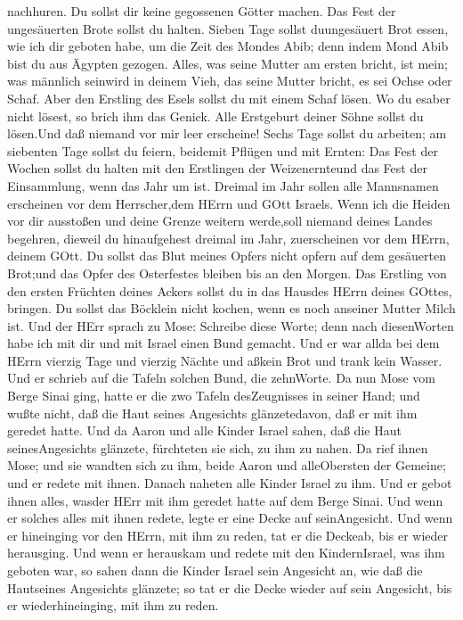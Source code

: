 nachhuren.  Du sollst dir keine gegossenen Götter machen.
 Das Fest der ungesäuerten Brote sollst du halten. Sieben
Tage sollst duungesäuert Brot essen, wie ich dir geboten habe, um die
Zeit des Mondes Abib; denn indem Mond Abib bist du aus Ägypten gezogen.
 Alles, was seine Mutter am ersten bricht, ist mein; was
männlich seinwird in deinem Vieh, das seine Mutter bricht, es sei Ochse
oder Schaf.  Aber den Erstling des Esels sollst du mit
einem Schaf lösen. Wo du esaber nicht lösest, so brich ihm das Genick.
Alle Erstgeburt deiner Söhne sollst du lösen.Und daß niemand vor mir
leer erscheine!  Sechs Tage sollst du arbeiten; am
siebenten Tage sollst du feiern, beidemit Pflügen und mit Ernten:
 Das Fest der Wochen sollst du halten mit den Erstlingen
der Weizenernteund das Fest der Einsammlung, wenn das Jahr um ist.
 Dreimal im Jahr sollen alle Mannsnamen erscheinen vor dem
Herrscher,dem HErrn und GOtt Israels.  Wenn ich die Heiden
vor dir ausstoßen und deine Grenze weitern werde,soll niemand deines
Landes begehren, dieweil du hinaufgehest dreimal im Jahr, zuerscheinen
vor dem HErrn, deinem GOtt.  Du sollst das Blut meines
Opfers nicht opfern auf dem gesäuerten Brot;und das Opfer des
Osterfestes bleiben bis an den Morgen.  Das Erstling von
den ersten Früchten deines Ackers sollst du in das Hausdes HErrn deines
GOttes, bringen. Du sollst das Böcklein nicht kochen, wenn es noch
anseiner Mutter Milch ist.  Und der HErr sprach zu Mose:
Schreibe diese Worte; denn nach diesenWorten habe ich mit dir und mit
Israel einen Bund gemacht.  Und er war allda bei dem HErrn
vierzig Tage und vierzig Nächte und aßkein Brot und trank kein Wasser.
Und er schrieb auf die Tafeln solchen Bund, die zehnWorte. 
Da nun Mose vom Berge Sinai ging, hatte er die zwo Tafeln desZeugnisses
in seiner Hand; und wußte nicht, daß die Haut seines Angesichts
glänzetedavon, daß er mit ihm geredet hatte.  Und da Aaron
und alle Kinder Israel sahen, daß die Haut seinesAngesichts glänzete,
fürchteten sie sich, zu ihm zu nahen.  Da rief ihnen Mose;
und sie wandten sich zu ihm, beide Aaron und alleObersten der Gemeine;
und er redete mit ihnen.  Danach naheten alle Kinder Israel
zu ihm. Und er gebot ihnen alles, wasder HErr mit ihm geredet hatte auf
dem Berge Sinai.  Und wenn er solches alles mit ihnen
redete, legte er eine Decke auf seinAngesicht.  Und wenn er
hineinging vor den HErrn, mit ihm zu reden, tat er die Deckeab, bis er
wieder herausging. Und wenn er herauskam und redete mit den
KindernIsrael, was ihm geboten war,  so sahen dann die
Kinder Israel sein Angesicht an, wie daß die Hautseines Angesichts
glänzete; so tat er die Decke wieder auf sein Angesicht, bis er
wiederhineinging, mit ihm zu reden.

